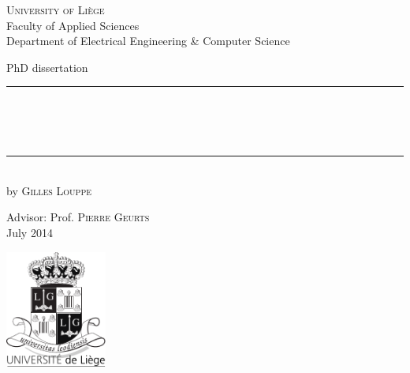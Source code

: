 
\begin{titlepage}
	\begin{addmargin}[-1cm]{-3cm}
    \begin{center}
        \large
        {\Large \textsc{University of Li{\`e}ge}}\\[1ex]
        Faculty of Applied Sciences\\
        Department of Electrical Engineering \& Computer Science\\

        \vfill

        PhD dissertation\\ \vskip1cm
        \rule{14cm}{0.4pt}\\ \bigskip
        \begingroup
            \Large
            \color{Maroon}\spacedallcaps{\myTitle} \\ \bigskip
        \endgroup
        \spacedlowsmallcaps{\mySubtitle} \\ \bigskip
        \rule{14cm}{0.4pt}\\ \vskip1cm
        by \textsc{Gilles Louppe}

        \vfill
        \vfill
        \vfill

        \hfill Advisor: Prof. \textsc{Pierre Geurts}\\
        \hfill July 2014
    \end{center}
    \vspace{-3.5cm}\includegraphics[width=0.25\textwidth]{figures/blason.pdf}
  \end{addmargin}
\end{titlepage}
